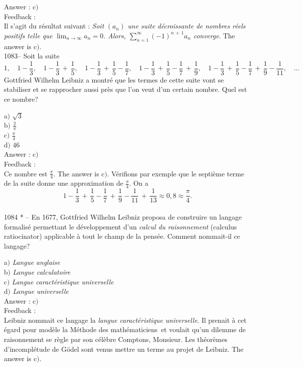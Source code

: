 \documentclass[letterpaper, 12pt]{article}
\begin{document}
Answer : c$)$\\

Feedback : \\
Il s'agit du r\'esultat suivant : {\sl Soit $(a_n)$ une suite
d\'ecroissante de nombres r\'eels positifs telle que
$\lim_{n\to\infty}a_n=0$. Alors,
$\sum_{n=1}^{\infty}(-1)^{n\,+\,1}a_n$ converge}.
The answer is c$)$.\\

1083-- Soit la suite
$$\displaystyle{1,\quad1-\frac13,\quad1-\frac13\,+\,\frac15,\quad1-\frac13\,+\,\frac15-\frac17,\quad1-\frac13\,+\,\frac15-\frac17\,+\,\frac19,\quad
1-\frac13\,+\,\frac15-\frac17\,+\,\frac19-\frac1{11},\quad\ldots}$$
Gottfried Wilhelm Leibniz a montr\'e que les termes de cette suite
vont se stabiliser et se rapprocher aussi pr\`es que l'on veut d'un
certain nombre. Quel est ce nombre?

a$)$ $\sqrt3$ \\ [2mm] b$)$ $\frac2{\pi}$ \\ [2mm] c$)$
$\frac{\pi}4$ \\ [2mm]
d$)$ $46$\\

Answer : c$)$\\

Feedback : \\
Ce nombre est $\frac{\pi}4$. The answer is c$)$. V\'erifions par
exemple que le septi\`eme terme de la suite donne une approximation
de $\frac{\pi}4$. On a
$$1-\frac13\,+\,\frac15-\frac17\,+\,\frac19-\frac1{11}\,+\,\frac1{13}\approx0,8\approx\frac{\pi}4.$$
\\

1084 * -- En 1677, Gottfried Wilhelm Leibniz proposa de construire
un langage formalis\'e permettant le d\'eveloppement d'un {\sl
calcul du raisonnement} (\og calculus ratiocinator\fg) applicable
\`a tout le champ de la pens\'ee. Comment nommait-il ce langage?

a$)$ {\sl Langue anglaise} \\
b$)$ {\sl Langue calculatoire} \\
c$)$ {\sl Langue caract\'eristique universelle} \\
d$)$ {\sl Langue universelle}\\

Answer : c$)$\\

Feedback :\\
Leibniz nommait ce langage la {\sl langue caract\'eristique
universelle}. Il prenait \`a cet \'egard pour mod\`ele la \og
M\'ethode des math\'ematiciens\fg\ et voulait qu'un dilemme de
raisonnement se r\`egle par son c\'el\`ebre \og Comptons,
Monsieur\fg . Les th\'eor\`emes d'incompl\'etude de G\"odel sont
venus mettre un terme au projet de Leibniz.
The answer is c$)$.\\
\end{document}
